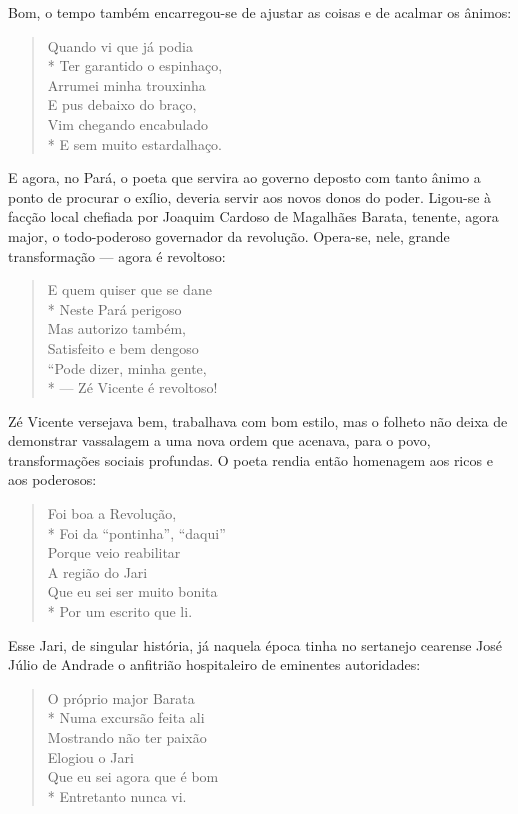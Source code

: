 Bom, o tempo também encarregou-se de ajustar as coisas e de acalmar os
ânimos:

\begin{verse}
Quando vi que já podia\\*
Ter garantido o espinhaço, \\
Arrumei minha trouxinha\\
E pus debaixo do braço,\\
Vim chegando encabulado\\*
E sem muito estardalhaço.
\end{verse}

E agora, no Pará, o poeta que servira ao governo deposto com tanto
ânimo a ponto de procurar o exílio, deveria servir aos novos donos do
poder. Ligou-se à facção local chefiada por Joaquim Cardoso de
Magalhães Barata, tenente, agora major, o todo-poderoso governador da
revolução. Opera-se, nele, grande transformação --- agora é revoltoso: 

\begin{verse}
E quem quiser que se dane\\*
Neste Pará perigoso\\
Mas autorizo também,\\
Satisfeito e bem dengoso\\
“Pode dizer, minha gente,\\*
--- Zé Vicente é revoltoso!
\end{verse}

Zé Vicente versejava bem, trabalhava com bom estilo, mas o folheto não
deixa de demonstrar vassalagem a uma nova ordem que acenava, para o
povo, transformações sociais profundas. O poeta rendia então
homenagem aos ricos e aos poderosos: 

\begin{verse}
Foi boa a Revolução,\\*
Foi da “pontinha”, “daqui”\\
Porque veio reabilitar\\
A região do Jari\\
Que eu sei ser muito bonita\\*
Por um escrito que li.
\end{verse}

Esse Jari, de singular história, já naquela época tinha no sertanejo
cearense José Júlio de Andrade o anfitrião hospitaleiro de eminentes
autoridades:

\begin{verse}
O próprio major Barata\\*
Numa excursão feita ali\\
Mostrando não ter paixão\\
Elogiou o Jari\\
Que eu sei agora que é bom\\*
Entretanto nunca vi.
\end{verse}

